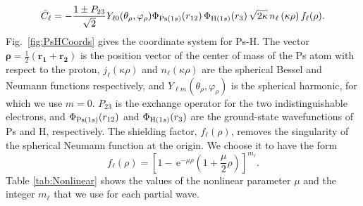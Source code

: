 \documentclass[preprint,showpacs,showkeys,preprintnumbers,amsmath,amssymb,longbibliography,pra,aps]{revtex4-1}
\newcommand{\ee} {\,\text{e}}
\begin{document}
\begin{equation}
\label{eq:CBar}
\bar{C}_\ell = -\frac{1\pm P_{23}}{\sqrt{2}}Y_{\ell 0}(\theta_\rho,
  \varphi_\rho)\Phi_{{\rm{Ps}}(1s)}\!\left(r_{12}\right) \Phi_{{\rm{H}}(1s)}\!\left(r_3\right)
  \sqrt{2\kappa} \,n_\ell\left(\kappa\rho\right) f_\ell(\rho).
\end{equation}
Fig.~\ref{fig:PsHCoords} gives the
coordinate system for Ps-H. The vector
$\bm{\rho} = \frac{1}{2}\left(\bm{r_1} + \bm{r_2}\right)$ is the position
vector of the center of mass of the Ps atom with respect to the proton,
$j_\ell\left(\kappa\rho\right)$ and $n_\ell\left(\kappa\rho\right)$ are
the spherical Bessel and Neumann functions respectively, and
$Y_{\ell m}(\theta_\rho, \varphi_\rho)$ is the spherical harmonic,
for which we use $m = 0$.
$P_{23}$ is the exchange operator for the two indistinguishable electrons, and
$\Phi_{{\rm{Ps}}(1s)}\!\left(r_{12}\right)$ and
$\Phi_{{\rm{H}}(1s)}\!\left(r_3\right)$ are the ground-state wavefunctions
of Ps and H, respectively. The shielding factor, $f_\ell(\rho)$,
removes the singularity of the spherical Neumann function
at the origin. We choose it to have the form
\begin{equation}
f_\ell(\rho) = \left[1 - \ee^{-\mu \rho} \left(1+\frac{\mu}{2}\rho\right)
\right]^{m_\ell}.
\label{eq:PartialWaveShielding}
\end{equation}
Table \ref{tab:Nonlinear} shows the values of the
nonlinear parameter $\mu$ and the integer $m_\ell$
that we use for each partial wave.
\end{document}
